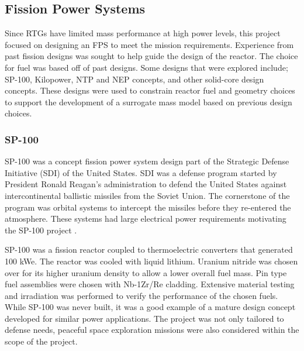 \subsection{Fission Power Systems}
Since RTGs have limited mass performance at high power levels, this project
focused on designing an
FPS to meet the mission requirements. Experience from past
fission designs was sought to help guide the design of the reactor. The choice
for fuel was based off of past designs. Some designs that were explored include;
SP-100, Kilopower, NTP and NEP concepts, and other solid-core design concepts.
These designs were used to constrain reactor fuel and geometry choices to
support the development of a surrogate mass model based on previous design
choices.
    
\subsubsection{SP-100}
    SP-100 was a concept fission power system design part of the
    Strategic Defense Initiative (SDI) of the United States. SDI was a defense program started by
    President Ronald Reagan's administration to defend the United States against intercontinental
    ballistic missiles from the Soviet Union. The cornerstone of the program was orbital systems to
    intercept the missiles before they re-entered the atmosphere. These systems
    had large electrical power requirements motivating the SP-100 project
    \citep{sp100}.

    SP-100 was a fission reactor coupled to thermoelectric converters that
    generated 100 kWe. The reactor was cooled with liquid lithium. Uranium
    nitride was chosen over \uox for its higher uranium density to allow a lower
    overall fuel mass. Pin type fuel assemblies were chosen with Nb-1Zr/Re
    cladding. Extensive material testing and irradiation was performed to
    verify the performance of the chosen fuels. While SP-100 was never built, it
    was a good example of a mature design concept developed for similar power
    applications. The project was not only tailored to defense needs, peaceful
    space exploration missions were also considered within the scope of the
    project.

